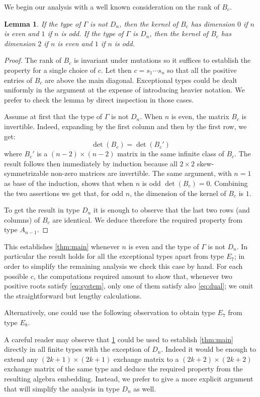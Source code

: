 \documentclass[pdftex]{sigma}
\numberwithin{equation}{section}
\numberwithin{figure}{section}
\newtheorem{Lemma}[Theorem]{Lemma}
\begin{document}
  We begin our analysis with a well known consideration on the rank of $B_c$.
  \begin{Lemma}
    \label{lem:dimensions}
    If the type of $\Gamma$ is not $D_n$, then the kernel of $B_c$ has dimension $0$ if $n$ is even and $1$ if $n$ is odd.
    If the type of $\Gamma$ is $D_n$, then the kernel of $B_c$ has dimension $2$ if $n$ is even and $1$ if $n$ is odd.
  \end{Lemma}
  \begin{proof}
    The rank of $B_c$ is invariant under mutations so it suffices to establish the property for a single choice of $c$.
    Let then $c=s_1\cdots s_n$ so that all the positive entries of $B_c$ are above the main diagonal.
    Exceptional types could be dealt uniformly in the argument at the expense of introducing heavier notation.
    We prefer to check the lemma by direct inspection in those cases.

    Assume at first that the type of $\Gamma$ is not $D_n$.
    When $n$ is even, the matrix $B_c$ is invertible.
    Indeed, expanding by the first column and then by the first row, we get:
    \[
      \det(B_c)=\det(B_c')
    \]
    where $B_c'$ is a $(n-2)\times(n-2)$ matrix in the same infinite class of $B_c$.
    The result follows then immediately by induction because all $2\times2$ skew-symmetrizable non-zero matrices are invertible.
    The same argument, with $n=1$ as base of the induction, shows that when $n$ is odd $\det(B_c)=0$.
    Combining the two assertions we get that, for odd $n$, the dimension of the kernel of $B_c$ is $1$.

    To get the result in type $D_n$ it is enough to observe that the last two rows (and columns) of $B_c$ are identical.
    We deduce therefore the required property from type $A_{n-1}$.
  \end{proof}

  This establishes \cref{thm:main} whenever $n$ is even and the type of $\Gamma$ is not $D_n$.
  In particular the result holds for all the exceptional types apart from type $E_7$; in order to simplify the remaining analysis we check this case by hand.
  For each possible $c$, the computations required amount to show that, whenever two positive roots satisfy \cref{eq:system}, only one of them satisfy also \cref{eq:dual}; we omit the straightforward but lengthy calculations.

  Alternatively, one could use the following observation to obtain type $E_7$ from type $E_8$.

  \begin{Remark}
    \label{rk:induction}
    A careful reader may observe that \cref{lem:dimensions} could be used to establish \cref{thm:main} directly in all finite types with the exception of $D_n$.
    Indeed it would be enough to extend any $(2k+1) \times (2k+1)$ exchange matrix to a $(2k+2) \times (2k+2)$ exchange matrix of the same type and deduce the required property from the resulting algebra embedding.
    Instead, we prefer to give a more explicit argument that will simplify the analysis in type $D_n$ as well.
  \end{Remark}
\end{document}
